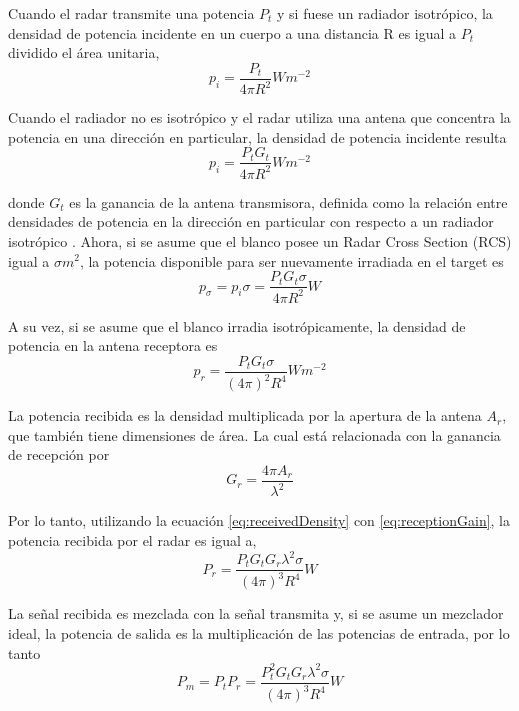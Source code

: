 Cuando el radar transmite una potencia $P_t$ y si fuese un radiador isotrópico, la densidad de potencia incidente en un cuerpo a una distancia R es igual a $P_t$ dividido el área unitaria,
\begin{equation}
  p_i = \dfrac{P_t}{4\pi R^2} Wm^{-2}
\end{equation}

Cuando el radiador no es isotrópico y el radar utiliza una antena que concentra la potencia en una dirección en particular, la densidad de potencia incidente resulta
\begin{equation}
  p_i = \dfrac{P_tG_t}{4\pi R^2} Wm^{-2}
\end{equation}

donde $G_t$ es la ganancia de la antena transmisora, definida como la relación entre densidades de potencia en la dirección en particular con respecto a un radiador isotrópico \cite{Richards2009}. Ahora, si se asume que el blanco posee un Radar Cross Section (RCS) igual a $\sigma m^2$, la potencia disponible para ser nuevamente irradiada en el target es 
\begin{equation}
  p_\sigma = p_i\sigma = \dfrac{P_tG_t\sigma}{4\pi R^2} W
\end{equation}

A su vez, si se asume que el blanco irradia isotrópicamente, la densidad de potencia en la antena receptora es 
\begin{equation} \label{eq:receivedDensity}
  p_r = \dfrac{P_tG_t\sigma}{(4\pi)^2 R^4} Wm^{-2}
\end{equation}

La potencia recibida es la densidad multiplicada por la apertura de la antena $A_r$, que también tiene dimensiones de área. La cual está relacionada con la ganancia de recepción por 
\begin{equation} \label{eq:receptionGain}
  G_r = \dfrac{4\pi A_r}{\lambda^2}
\end{equation}

Por lo tanto, utilizando la ecuación \ref{eq:receivedDensity} con \ref{eq:receptionGain}, la potencia recibida por el radar es igual a,
\begin{equation}
  P_r = \dfrac{P_tG_tG_r\lambda^2\sigma}{(4\pi)^3 R^4} W
\end{equation}

La señal recibida es mezclada con la señal transmita y, si se asume un mezclador ideal, la potencia de salida es la multiplicación de las potencias de entrada, por lo tanto
\begin{equation}
  P_m = P_tP_r = \dfrac{P_t^2G_tG_r\lambda^2\sigma}{(4\pi)^3 R^4} W
\end{equation}

